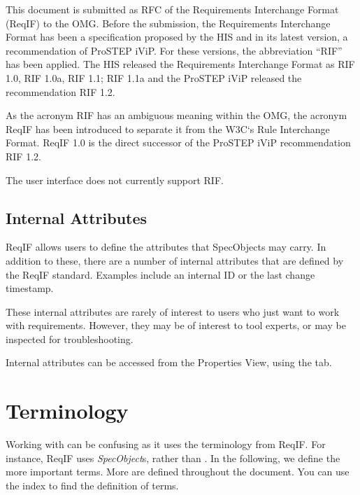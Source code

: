 This document is submitted as RFC of the Requirements Interchange Format (ReqIF) to the OMG.  Before the submission, the Requirements Interchange Format has been a specification proposed by the HIS and in its latest version, a recommendation of ProSTEP iViP.  For these versions, the abbreviation ``RIF'' has been applied.  The HIS released the Requirements Interchange Format as RIF 1.0, RIF 1.0a, RIF 1.1; RIF 1.1a and the ProSTEP iViP released the recommendation RIF 1.2.

As the acronym RIF has an ambiguous meaning within the OMG, the acronym ReqIF has been introduced to separate it from the W3C`s Rule Interchange Format.  ReqIF 1.0 is the direct successor of the ProSTEP iViP recommendation RIF 1.2.

\begin{warning}
The \pror{} user interface does not currently support RIF.
\end{warning}

\subsection{Internal Attributes}
\label{sec:reqif_internal_attributes}

ReqIF allows users to define the attributes that SpecObjects may carry.  In addition to these, there are a number of internal attributes that are defined by the ReqIF standard.  Examples include an internal ID or the last change timestamp.

These internal attributes are rarely of interest to users who just want to work with requirements.  However, they may be of interest to tool experts, or may be inspected for troubleshooting.

Internal attributes can be accessed from the Properties View, using the  tab.

\section{Terminology}
\label{sec:terminology}

Working with \pror{} can be confusing as it uses the terminology from ReqIF.  For instance, ReqIF uses \textit{SpecObject}s, rather than .  In the following, we define the more important terms.  More are defined throughout the document.  You can use the index to find the definition of terms.

